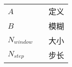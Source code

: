 \documentclass{standalone}
\begin{document}
\begin{symbolstable}
\begin{table}[htbp]
\renewcommand{\arraystretch}{0.8}
\linespread{1}
\centering
\vspace{-0.4cm}
\xiaosi
\begin{tabular}{>{\raggedleft\arraybackslash}p{}p{}p{}}
$A$ & & 定义 \\
$B$ & & 模糊 \\
$N_{window}$ & & 大小 \\
$N_{step}$ & & 步长 \\

\end{tabular}
\end{table}
\end{symbolstable}
\end{document}
